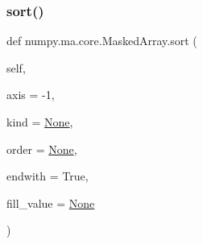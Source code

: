 \subsubsection{\texorpdfstring{sort()}{sort()}}
{\footnotesize\ttfamily def numpy.\+ma.\+core.\+Masked\+Array.\+sort (\begin{DoxyParamCaption}\item[{}]{self,  }\item[{}]{axis = {\ttfamily -\/1},  }\item[{}]{kind = {\ttfamily \hyperlink{namespacenumpy_1_1ma_1_1core_a647ee1848dfa3692fe35a663a2aa40b3}{None}},  }\item[{}]{order = {\ttfamily \hyperlink{namespacenumpy_1_1ma_1_1core_a647ee1848dfa3692fe35a663a2aa40b3}{None}},  }\item[{}]{endwith = {\ttfamily True},  }\item[{}]{fill\+\_\+value = {\ttfamily \hyperlink{namespacenumpy_1_1ma_1_1core_a647ee1848dfa3692fe35a663a2aa40b3}{None}} }\end{DoxyParamCaption})}

